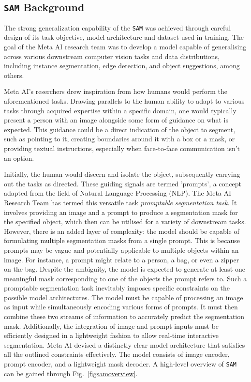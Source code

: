 \subsection{\texttt{SAM} Background}\label{SAMbg}
The strong generalization capability of the \texttt{SAM} was achieved through careful design of its task objective, model architecture and dataset used in training. The goal of the Meta AI research team was to develop a model capable of generalising across various downstream computer vision tasks and data distributions, including instance segmentation, edge detection, and object suggestions, among others.

Meta AI's reserchers drew inspiration from how humans would perform the aforementioned tasks. Drawing parallels to the human ability to adapt to various tasks through acquired expertise within a specific domain, one would typically present a person with an image alongside some form of guidance on what is expected. This guidance could be a direct indication of the object to segment, such as pointing to it, creating boundaries around it with a box or a mask, or providing textual instructions, especially when face-to-face communication isn't an option.

Initially, the human would discern and isolate the object, subsequently carrying out the tasks as directed. These guiding signals are termed 'prompts', a concept adapted from the field of Natural Language Processing (NLP). The Meta AI Research Team has termed this versatile task \textit{promptable segmentation task}. It involves providing an image and a prompt to produce a segmentation mask for the specified object, which then can be utilised for a variety of downstream tasks. However, there is an added layer of complexity: the model should be capable of formulating multiple segmentation masks from a single prompt. This is because prompts may be vague and potentially applicable to multiple objects within an image. For instance, a prompt might relate to a person, a bag, or even a zipper on the bag. Despite the ambiguity, the model is expected to generate at least one meaningful mask corresponding to one of the objects the prompt refers to.
Such a promptable segmentation task inevitably imposes specific constraints on the possible model architectures. The model must be capable of processing an image as input while simultaneously encoding various forms of prompts. It must then combine these two streams of information to accurately predict the segmentation mask. Additionally, the integration of image and prompt inputs must be efficiently designed in a lightweight fashion to allow real-time interactive segmentation. 
Meta AI devised a distinctly clear model architecture that satisfies all the outlined constraints effectively. The model consists of image encoder, prompt encoder, and a lightweight mask decoder. A high-level overview of \texttt{SAM} can be gained through Fig.~\ref{figsamoverview}.

